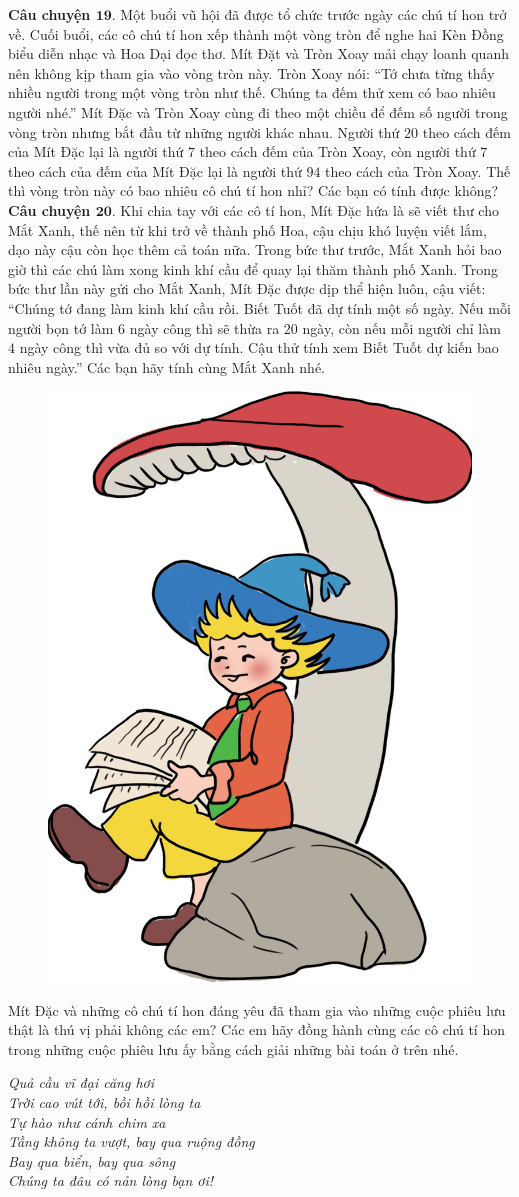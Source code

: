 	\textbf{\color{toancuabi}Câu chuyện $\pmb{19.}$} Một buổi vũ hội đã được tổ chức trước ngày các chú tí hon trở về. Cuối buổi, các cô chú tí hon xếp thành một vòng tròn để nghe hai Kèn Đồng biểu diễn nhạc và Hoa Dại đọc thơ. Mít Đặt và Tròn Xoay mải chạy loanh quanh nên không kịp tham gia vào vòng tròn này. Tròn Xoay nói: “Tớ chưa từng thấy nhiều người trong một vòng tròn như thế. Chúng ta đếm thử xem có bao nhiêu người nhé.” Mít Đặc và Tròn Xoay cùng đi theo một chiều để đếm số người trong vòng tròn nhưng bắt đầu từ những người khác nhau. Người thứ $20$ theo cách đếm của Mít Đặc lại là người thứ $7$ theo cách đếm của Tròn Xoay, còn người thứ $7$ theo cách của đếm của Mít Đặc lại là người thứ $94$ theo cách của Tròn Xoay. Thế thì vòng tròn này có bao nhiêu cô chú tí hon nhỉ? Các bạn có tính được không?
	\vskip 0.1cm
	\textbf{\color{toancuabi}Câu chuyện $\pmb{20.}$} Khi chia tay với các cô tí hon, Mít Đặc hứa là sẽ viết thư cho Mắt Xanh, thế nên từ khi trở về thành phố Hoa, cậu chịu khó luyện viết lắm, dạo này cậu còn học thêm cả toán nữa. Trong bức thư trước, Mắt Xanh hỏi bao giờ thì các chú làm xong kinh khí cầu để quay lại thăm thành phố Xanh. Trong bức thư lần này gửi cho Mắt Xanh, Mít Đặc được dịp thể hiện luôn, cậu viết: “Chúng tớ đang làm kinh khí cầu rồi. Biết Tuốt đã dự tính một số ngày. Nếu mỗi người bọn tớ làm $6$ ngày công thì sẽ thừa ra $20$ ngày, còn nếu mỗi người chỉ làm $4$ ngày công thì vừa đủ so với dự tính. Cậu thử tính xem Biết Tuốt dự kiến bao nhiêu ngày.” Các bạn hãy tính cùng Mắt Xanh nhé.
	\begin{figure}[H]
		\centering
		\vspace*{-5pt}
		\captionsetup{labelformat= empty, justification=centering}
		\includegraphics[width=0.35\linewidth]{Hinh22_MitDacLamToan}
		\vspace*{-10pt}
	\end{figure}
	Mít Đặc và những cô chú tí hon đáng yêu đã tham gia vào những cuộc phiêu lưu thật là thú vị phải không các em? Các em hãy đồng hành cùng các cô chú tí hon trong những cuộc phiêu lưu ấy bằng cách giải những bài toán ở trên nhé. 
	\begin{center}
		\textit{Quả cầu vĩ đại căng hơi\\
			Trời cao vút tới, bồi hồi lòng ta\\
			Tự hào như cánh chim xa\\
			Tầng không ta vượt, bay qua ruộng đồng\\
			Bay qua biển, bay qua sông\\
			Chúng ta đâu có nản lòng bạn ơi!}
	\end{center}